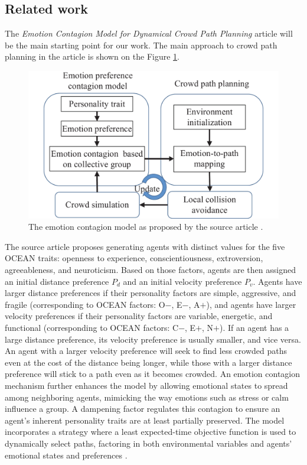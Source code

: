 \documentclass[9pt]{pnas-new}
\begin{document}
\subsection{Related work}
The \textit{Emotion Contagion Model for Dynamical Crowd Path Planning} article will be the main starting point for our work. The main approach to crowd path planning in the article is shown on the Figure \ref{fig:outline}. 
\begin{figure}[h!]
    \centering
    \includegraphics[width=1\linewidth]{fig/outline.jpg}
    \caption{The emotion contagion model as proposed by the source article \cite{Wu_Huang_Tian_Yan_Yu_2024}.}
    \label{fig:outline}
\end{figure}

The source article proposes generating agents with distinct values for the five OCEAN traits: openness to experience, conscientiousness, extroversion, agreeableness, and neuroticism. Based on those factors, agents are then assigned an initial distance preference ${P_d}$ and an initial velocity preference ${P_v}$. Agents have larger distance preferences if their personality factors are simple, aggressive, and fragile (corresponding to OCEAN factors: O${-}$, E${-}$, A${+}$), and agents have larger velocity preferences if their personality factors are variable, energetic, and functional (corresponding to OCEAN factors: C${-}$, E${+}$, N${+}$). If an agent has a large distance preference, its velocity preference is usually smaller, and vice versa. An agent with a larger velocity preference will seek to find less crowded paths even at the cost of the distance being longer, while those with a larger distance preference will stick to a path even as it becomes crowded. An emotion contagion mechanism further enhances the model by allowing emotional states to spread among neighboring agents, mimicking the way emotions such as stress or calm influence a group. A dampening factor regulates this contagion to ensure an agent's inherent personality traits are at least partially preserved. The model incorporates a strategy where a least expected-time objective function is used to dynamically select paths, factoring in both environmental variables and agents’ emotional states and preferences \cite{Wu_Huang_Tian_Yan_Yu_2024}.
\end{document}
